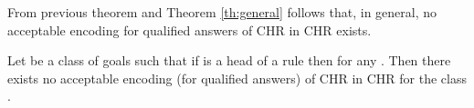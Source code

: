 From previous theorem and Theorem \ref{th:general} follows that, in general, no acceptable encoding for qualified answers of CHR in CHR exists.

\begin{corollary}\label{ch:general1}
Let  be a class of goals such that if    is a head of a rule then  for any . Then there exists no acceptable encoding (for qualified answers) of
CHR in CHR for the class .
\end{corollary}


